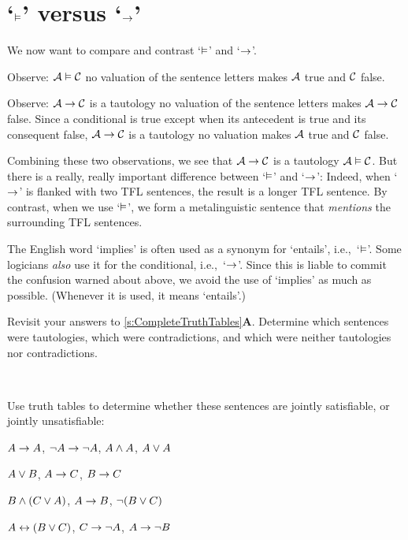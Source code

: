 \section{`$\vDash$' versus `$\rightarrow$'}\label{entails-v-iff}
We now want to compare and contrast `$\vDash$' and `$\rightarrow$'.

Observe: $\mathcal{A} \vDash \mathcal{C}$ \ifeff{} no valuation of the sentence letters makes $\mathcal{A}$ true and $\mathcal{C}$ false.

Observe: $\mathcal{A} \rightarrow \mathcal{C}$ is a tautology \ifeff{} no valuation of the sentence letters makes $\mathcal{A} \rightarrow \mathcal{C}$ false. Since a conditional is true except when its antecedent is true and its consequent false, $\mathcal{A} \rightarrow \mathcal{C}$ is a tautology \ifeff{} no valuation makes $\mathcal{A}$ true and $\mathcal{C}$ false.

Combining these two observations, we see that $\mathcal{A} \rightarrow \mathcal{C}$  is a tautology \ifeff{}  $\mathcal{A} \vDash \mathcal{C}$. But there is a really, really important difference between `$\vDash$' and `$\rightarrow$':
Indeed, when `$\rightarrow$' is flanked with two TFL sentences, the result is a longer TFL sentence. By contrast, when we use `$\vDash$', we form a metalinguistic sentence that \emph{mentions} the surrounding TFL sentences.

The English word `implies' is often used as a synonym for `entails',
i.e.,~`$\vDash$'. Some logicians \emph{also} use it for the
conditional, i.e.,~`$\rightarrow$'. Since this is liable to commit the
confusion warned about above, we avoid the use of `implies' as much as
possible. (Whenever it is used, it means `entails'.)


\practiceproblems
\problempart
Revisit your answers to \cref{s:CompleteTruthTables}\textbf{A}. Determine which sentences were tautologies, which were contradictions, and which were neither tautologies nor contradictions.
\solutions

\

\problempart
\label{pr.TT.satisfiable}
Use truth tables to determine whether these sentences are jointly satisfiable, or jointly unsatisfiable:
\begin{compactlist}
\item $A\rightarrow A$, $\neg A \rightarrow \neg A$, $A\wedge A$, $A\vee A$ %
\item $A\vee B$, $A\rightarrow C$, $B\rightarrow C$ %
\item $B\wedge(C\vee A)$, $A\rightarrow B$, $\neg(B\vee C)$  %
\item $A\leftrightarrow(B\vee C)$, $C\rightarrow \neg A$, $A\rightarrow \neg B$ %
\end{compactlist}


